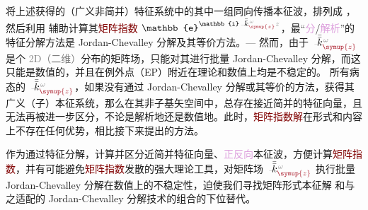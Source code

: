 将上述获得的（广义非简并）\textcolor{PineGreen}{特征系统}中的其中一组同向传播\textcolor{PineGreen}{本征波}，排列成 \cite{borzdovWavesLinearQuadratic1996}，然后利用  辅助计算其\textcolor{Maroon}{矩阵指数} $\mathbb{e}^{\mathbb{i} \xint{\begin{smallmatrix} ~ \\ {}^{}_{\mathcolor{gray}{-}} \\ ~ \end{smallmatrix}}{15}{\bar{\bar{k}}}_{\textcolor{Maroon}{\symup{z}}}^{\;\! \mathcolor{gray}{\omega}} \mathcolor{gray}{z}}$，最“\textcolor{Plum}{分}/\textcolor{Plum}{解析}”的特征分解方法是 \textcolor{PineGreen}{Jordan-Chevalley 分解}及其等价方法。--- 然而，由于 $\xint{\begin{smallmatrix} ~ \\ {}^{}_{\mathcolor{gray}{-}} \\ ~ \end{smallmatrix}}{15}{\bar{\bar{k}}}_{\textcolor{Maroon}{\symup{z}}}^{\;\! \mathcolor{gray}{\omega}}$ 是个 \textcolor{gray}{2D（二维）}分布的矩阵场，只能对其进行批量 \textcolor{PineGreen}{Jordan-Chevalley 分解}，而这只能是数值的，并且在\textcolor{PineGreen}{例外点}（\textcolor{PineGreen}{EP}）附近在理论和数值上均是不稳定的\cite{molerNineteenDubiousWays2003}。{\four} 所有病态的 $\xint{\begin{smallmatrix} ~ \\ {}^{}_{\mathcolor{gray}{-}} \\ ~ \end{smallmatrix}}{15}{\bar{\bar{k}}}_{\textcolor{Maroon}{\symup{z}}}^{\;\! \mathcolor{gray}{\omega}}$，如果没有通过 \textcolor{PineGreen}{Jordan-Chevalley 分解}或其等价的方法，获得其广义（子）\textcolor{PineGreen}{本征系统}，那么在其非子基矢空间中，总存在接近简并的\textcolor{PineGreen}{特征向量}，且无法再被进一步区分，不论是解析地还是数值地。此时，\textcolor{Maroon}{矩阵指数解}在形式和内容上不存在任何优势\cite{berremanOpticsStratifiedAnisotropic1972,stallingaBerreman4x4Matrix1999}，相比接下来提出的方法。

作为通过特征分解，计算并区分近简并\textcolor{PineGreen}{特征向量}、\textcolor{Plum}{正反向}\textcolor{PineGreen}{本征波}，方便计算\textcolor{Maroon}{矩阵指数}，并有可能避免\textcolor{Maroon}{矩阵指数}发散的强大理论工具，对矩阵场 $\xint{\begin{smallmatrix} ~ \\ {}^{}_{\mathcolor{gray}{-}} \\ ~ \end{smallmatrix}}{15}{\bar{\bar{k}}}_{\textcolor{Maroon}{\symup{z}}}^{\;\! \mathcolor{gray}{\omega}}$ 执行批量 \textcolor{PineGreen}{Jordan-Chevalley 分解}在数值上的不稳定性\cite{molerNineteenDubiousWays2003}，迫使我们寻找矩阵形式\textcolor{PineGreen}{本征解}  和与之适配的 \textcolor{PineGreen}{Jordan-Chevalley 分解}技术的组合的下位替代。

